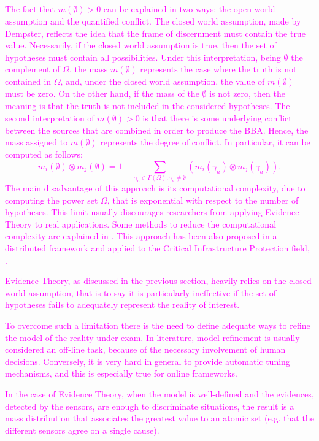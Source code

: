 \documentclass[journal]{IEEEtran}
\newcommand{\GO}[1]{\textcolor{magenta}{{#1}}}
\begin{document}
\GO{The fact that  $m(\emptyset) > 0$ can be explained in two ways: the open world assumption and the quantified conflict. The closed world assumption, made by Dempster, reflects the idea that the frame of discernment must contain the true value. Necessarily, if the closed world assumption is true, then the set of hypotheses must contain all possibilities. Under this interpretation, being $\emptyset$ the complement of $\Omega$, the mass $m(\emptyset)$ represents the case where the truth is not contained in $\Omega$, and, under the closed world assumption, the value of $m(\emptyset)$ must be zero. On the other hand, if the mass of the $\emptyset$ is not zero, then the meaning is that the truth is not included in the considered hypotheses. The second interpretation of $m(\emptyset) > 0$ is that there is some underlying conflict between the sources that are combined in order to produce the BBA. Hence, the mass assigned to $m(\emptyset)$ represents the degree of conflict. In particular, it can be computed as follows:
\begin{equation}
m_i(\emptyset) \otimes m_j(\emptyset) = 1 - \sum_{\gamma_a\in \Gamma(\Omega), \gamma_a\neq \emptyset} \left( m_i(\gamma_a) \otimes m_j(\gamma_a)\right).
\label{eq:smets_empty}
\end{equation}
The main disadvantage of this approach is its computational complexity, due to computing the power set $\Omega$, that is exponential with respect to the number of hypotheses. This limit usually discourages researchers from applying Evidence Theory to real applications. Some methods to reduce the computational complexity are explained in \cite{shafer_mathematical_1976}.}
\GO{This approach has been also proposed in a distributed framework and applied to the Critical Infrastructure Protection field, \cite{foglietta_networked_2012}.}

\GO{Evidence Theory, as discussed in the previous section, heavily relies on the closed world assumption, that is to say it is particularly ineffective if the set of hypotheses fails to adequately represent the reality of interest.}

\GO{To overcome such a limitation there is the need to define adequate ways to refine the model of the reality under exam. In literature, model refinement is usually considered an off-line task, because of the necessary involvement of human decisions.
Conversely, it is very hard in general to provide automatic tuning mechanisms, and this is especially true for online frameworks.}

\GO{In the case of Evidence Theory, when the model is well-defined and the evidences, detected by the sensors, are enough to discriminate situations, the result is a mass distribution that associates the greatest value to an atomic set (e.g. that the different sensors agree on a single cause).}
\end{document}
